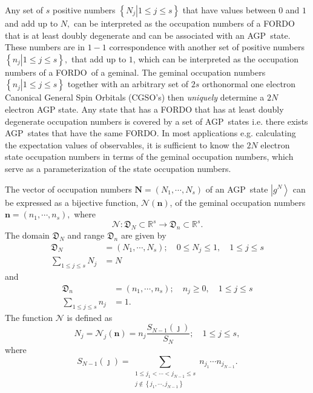 \documentclass[titlepage]{article}%
\begin{document}
Any set of $s$ positive numbers $\left\{  \left.  N_{j}\right\vert 1\leq j\leq
s\right\}  $ that have values between $0$ and $1$ and add up to $N,$ can be
interpreted as the occupation numbers of a FORDO that is at least doubly
degenerate and can be associated with an AGP\ state. These numbers are in
$1-1$ correspondence with another set of positive numbers $\left\{  \left.
n_{j}\right\vert 1\leq j\leq s\right\}  ,$ that add up to $1$, which can be
interpreted as the occupation numbers of a FORDO\ of a geminal. The geminal
occupation numbers $\left\{  \left.  n_{j}\right\vert 1\leq j\leq s\right\}  $
together with an arbitrary set of $2s$ orthonormal one electron Canonical
General Spin Orbitals (CGSO's) then \emph{uniquely }determine a $2N$ electron
AGP state. Any state that has a FORDO that has at least doubly degenerate
occupation numbers is covered by a set of AGP\ states i.e. there exists
AGP\ states that have the same FORDO. In most applications e.g. calculating
the expectation values of observables, it is sufficient to know the $2N$
electron state occupation numbers in terms of the geminal occupation numbers,
which serve as a parameterization of the state occupation numbers.

The vector of occupation numbers $\mathbf{N}=\left(  N_{1},\cdots
,N_{s}\right)  $ of an AGP\ state $\left\vert g^{N}\right\rangle $ can be
expressed as a bijective function, $\mathcal{N}\left(  \mathbf{n}\right)  $,
of the geminal occupation numbers $\mathbf{n}=\left(  n_{1},\cdots
,n_{s}\right)  ,$ where
\begin{equation}
\mathcal{N}:\mathfrak{D}_{N}\subset\mathbb{R}^{s}\rightarrow\mathfrak{D}%
_{n}\subset\mathbb{R}^{s}.
\end{equation}
The domain $\mathfrak{D}_{N}$ and range $\mathfrak{D}_{n}$ are given by%
\begin{align}
\mathfrak{D}_{N}  &  =\left(  N_{1},\cdots,N_{s}\right)  ;\quad0\leq N_{j}%
\leq1,\quad1\leq j\leq s\nonumber\\
\sum_{1\leq j\leq s}N_{j}  &  =N
\end{align}
and
\begin{align}
\mathfrak{D}_{n}  &  =\left(  n_{1},\cdots,n_{s}\right)  ;\quad n_{j}%
\geq0,\quad1\leq j\leq s\nonumber\\
\sum_{1\leq j\leq s}n_{j}  &  =1.
\end{align}
The function $\mathcal{N}$ is defined as
\begin{equation}
N_{j}=\mathcal{N}_{j}\left(  \mathbf{n}\right)  =n_{j}\frac{S_{N-1}\left(
\jmath\right)  }{S_{N}};\quad1\leq j\leq s,
\end{equation}
where
\begin{equation}
S_{N-1}\left(  \jmath\right)  =\sum_{\substack{1\leq j_{1}<\cdots<j_{N-1}\leq
s\\j\notin\left\{  j_{1},\cdots,j_{N-1}\right\}  }}n_{j_{1}}\cdots n_{j_{N-1}%
}.
\end{equation}
\end{document}
